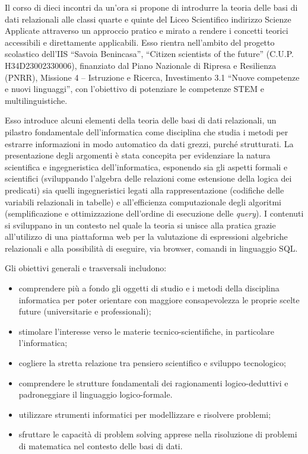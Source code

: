 \documentclass[withtimes]{easychair}
\theoremstyle{definition}
\begin{document}
Il corso di dieci incontri da un'ora si propone di introdurre la teoria delle basi di dati relazionali alle classi quarte e quinte del Liceo Scientifico indirizzo Scienze Applicate attraverso un approccio pratico e mirato a rendere i concetti teorici accessibili e direttamente applicabili. Esso rientra nell'ambito del progetto scolastico dell'IIS ``Savoia Benincasa'', ``Citizen scientists of the future'' (C.U.P. H34D23002330006), finanziato dal Piano Nazionale di Ripresa e Resilienza (PNRR), Missione 4 -- Istruzione e Ricerca, Investimento 3.1 ``Nuove competenze e nuovi linguaggi'', con l'obiettivo di potenziare le competenze STEM e multilinguistiche.

Esso introduce alcuni elementi della teoria delle basi di dati relazionali, un pilastro fondamentale dell'informatica come disciplina che studia i metodi per estrarre informazioni in modo automatico da dati grezzi, purché strutturati. La presentazione degli argomenti è stata concepita per evidenziare la natura scientifica e ingegneristica dell'informatica,  esponendo sia gli aspetti formali e scientifici (sviluppando l'algebra delle relazioni come estensione della logica dei predicati) sia quelli ingegneristici legati alla rappresentazione (codifiche delle variabili relazionali in tabelle) e all'efficienza computazionale degli algoritmi (semplificazione e ottimizzazione dell'ordine di esecuzione delle \emph{query}). I contenuti si sviluppano in un contesto nel quale la teoria si unisce alla pratica grazie all'utilizzo di una piattaforma web per la valutazione di espressioni algebriche relazionali e alla possibilità di eseguire, via browser, comandi in linguaggio SQL.

Gli obiettivi generali e trasversali includono:

\begin{itemize}
 \item comprendere più a fondo gli oggetti di studio e i metodi della disciplina informatica per poter orientare con maggiore consapevolezza le proprie scelte future (universitarie e professionali);
 \item stimolare l'interesse verso le materie tecnico-scientifiche, in particolare l'informatica;
 \item cogliere la stretta relazione tra pensiero scientifico e sviluppo tecnologico;
 \item comprendere le strutture fondamentali dei ragionamenti logico-deduttivi
e padroneggiare il linguaggio logico-formale.
 \item utilizzare strumenti informatici per modellizzare e risolvere problemi;
 \item sfruttare le capacità di problem solving apprese nella risoluzione di problemi di matematica nel contesto delle basi di dati.
\end{itemize}
\end{document}
